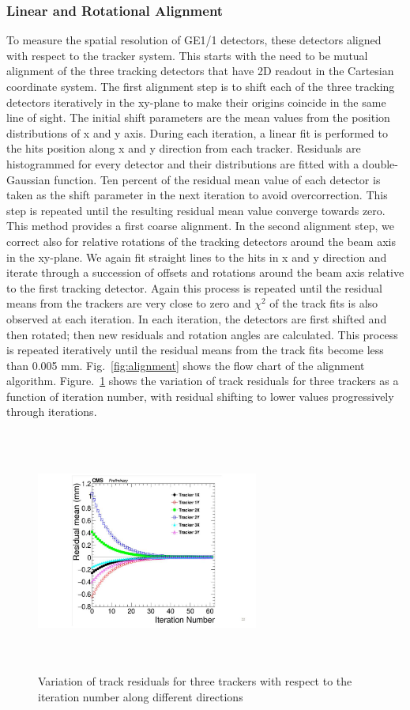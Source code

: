 \subsubsection{Linear and Rotational Alignment}
To measure the spatial resolution of GE1/1 detectors, these detectors aligned with respect to the tracker system.
This starts with the need to be mutual alignment of the three tracking detectors that have 2D readout in the Cartesian coordinate system.
The first alignment step is to shift each of the three tracking detectors iteratively in the xy-plane to make their origins coincide in the same line of sight.
The initial shift parameters are the mean values from the position distributions  of x and y axis.
During each iteration, a linear fit is performed to the hits position along x and y direction from each tracker.
Residuals are histogrammed for every detector and their distributions are fitted with a double-Gaussian function.
Ten percent of the residual mean value of each detector is taken as the shift parameter in the next iteration to avoid overcorrection.
This step is repeated until the resulting residual mean value converge towards zero.
This method provides a first coarse alignment.
In the second alignment step, we correct also for relative rotations of the tracking detectors around the beam axis in the xy-plane.
We again fit straight lines to the hits in x and y direction and iterate through a succession of offsets and rotations around the beam axis relative to the first tracking detector.
Again this process is repeated until the residual means from the trackers are very close to zero and $\chi^2$ of the track fits is also observed at each iteration.
In each iteration, the detectors are first shifted and then rotated; then new residuals and rotation angles are calculated.
This process is repeated iteratively until the residual means from the track fits become less than 0.005 mm. Fig.~\ref{fig:alignment} shows the flow chart of the alignment algorithm.
Figure.~\ref{fig:alignmentIteration} shows the variation of track residuals for three trackers as a function of iteration number, with residual shifting to lower values progressively through iterations.
\begin{figure}[!htbp]
\centering
\includegraphics[width=0.65\textwidth,height=8cm]{figures/GEM/Tracker_iterative_alignment.pdf}
\caption{Variation of track residuals for three trackers with respect to the iteration number along different directions}\label{fig:alignmentIteration}
\end{figure}

